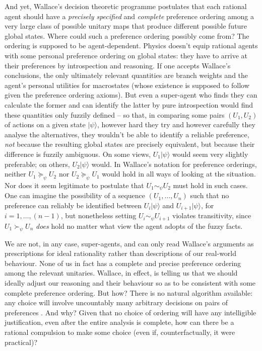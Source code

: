 \documentclass[aps,
pra,epsfig,12pt,nofootinbib]{revtex4}
\def\ket#1{| #1\rangle}
\begin{document}
And yet, Wallace's decision theoretic programme postulates
that each rational agent should have a {\it precisely specified} 
and {\it complete}
preference ordering among a very large class of
possible unitary maps that produce different possible 
future global states.  Where could such
a preference ordering possibly come from?  
The ordering is supposed to be agent-dependent.  Physics doesn't equip rational
agents with some personal preference ordering on global states: they
have to arrive at their preferences by introspection and reasoning.
If one accepts Wallace's conclusions, the only ultimately relevant
quantities are branch weights and the agent's personal utilities for 
macrostates (whose existence is supposed to follow given the preference
ordering axioms).
But even a super-agent who finds they can calculate the former and can
identify the latter by pure introspection would find these quantities 
only fuzzily defined -- so that, in comparing
some pairs $( U_1 , U_2 )$ of actions on a given state $\ket{ \psi }$, 
however hard they try and however carefully they analyse the alternatives, 
they wouldn't be able to identify a reliable preference, {\it not}
because the resulting global states are precisely equivalent, but 
because their difference is fuzzily ambiguous.
On some views, $U_1 \ket{ \psi }$ would seem very slightly preferable;
on others, $U_2 \ket{ \psi }$ would.  
In Wallace's notation \cite{wallacevolone} for preference orderings, 
neither $U_1 \succeq_{\psi} U_2$ nor $U_2 \succeq_{\psi} U_1$ would hold in all
ways of looking at the situation.  
Nor does it seem legitimate to postulate that $ U_1 \sim_{\psi} U_2 $ 
must hold in such cases.  One can imagine the possibility
of a sequence $( U_1 , \ldots , U_n )$ such that no 
preference can reliably be identified
between $U_i \ket {\psi }$ and $U_{i+1} \ket{\psi}$, for $i=1 , \ldots, (n-1)$,
but nonetheless setting $U_i \sim_{\psi} U_{i+1}$ violates transitivity,
since $U_1  \succ_{\psi} U_n $ {\it does} hold no matter what 
view the agent adopts of the fuzzy facts.   

We are not, in any case, super-agents, and
can only read Wallace's arguments as prescriptions
for ideal rationality rather than descriptions of our real-world behaviour.
None of us in fact has a complete and precise preference 
ordering among the relevant unitaries.   Wallace, in effect,
is telling us that we should ideally adjust our
reasoning and their behaviour so as to be consistent with 
some complete preference ordering.   But how?  There is no 
natural algorithm available: any choice will involve uncountably
many arbitrary decisions on pairs of preferences \cite{savageworry}.   
And why?  Given that no 
choice of ordering will have any intelligible justification, 
even after the entire analysis is complete, how can there 
be a rational compulsion to make some choice (even if, 
counterfactually, it were practical)?
\end{document}
